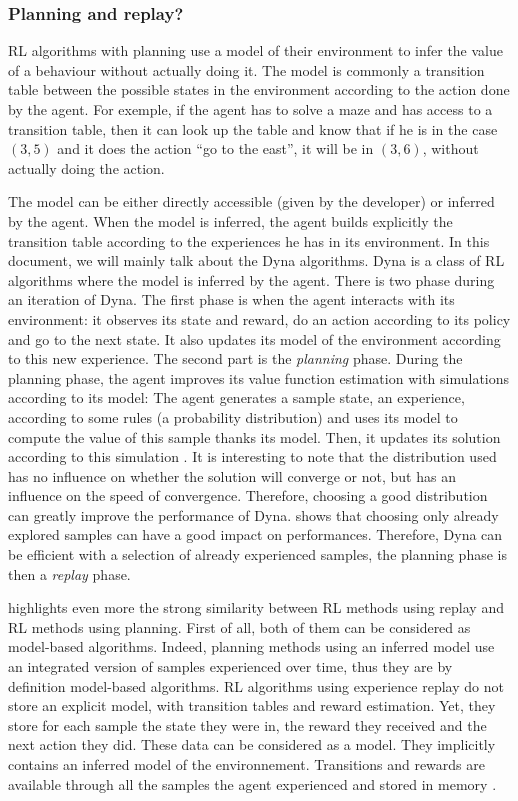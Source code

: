 \documentclass[]{article}
\begin{document}
\subsubsection{Planning and replay?}
\label{subs:Planning and replay}

RL algorithms with planning use a model of their environment to infer the value  of a behaviour without actually doing it. The model is commonly a transition table between the possible states in the environment according to the action done by the agent. For exemple, if the agent has to solve a maze and has access to a transition table, then it can look up the table and know that if he is in the case \((3, 5)\) and it does the action ``go to the east'', it will be in \((3, 6)\), without actually doing the action.

The model can be either directly accessible (given by the developer) or inferred by the agent. When the model is inferred, the agent builds explicitly the transition table according to the experiences he has in its environment. In this document, we will mainly talk about the Dyna algorithms. Dyna is a class of RL algorithms where the model is inferred by the agent. There is two phase during an iteration of Dyna. The first phase is when the agent interacts with its environment: it observes its state and reward, do an action according to its policy and go to the next state. It also updates its model of the environment according to this new experience. The second part is the \emph{planning} phase. During the planning phase, the agent improves its value function estimation with simulations according to its model: The agent generates a sample state, an experience, according to some rules (a probability distribution) and uses its model to compute the value of this sample thanks its model. Then, it updates its solution according to this simulation \parencite{sutton_dyna-style_2012}.
It is interesting to note that the distribution used has no influence on whether the solution will converge or not, but has an influence on the speed of convergence. Therefore, choosing a good distribution can greatly improve the performance of Dyna. \textcite{sutton_dyna-style_2012} shows that choosing only already explored samples can have a good impact on performances. Therefore, Dyna can be efficient with a selection of already experienced samples, the planning phase is then a \emph{replay} phase.

\textcite{vanseijen_deeper_2015} highlights even more the strong similarity between RL methods using replay and RL methods using planning. First of all, both of them can be considered as model-based algorithms. Indeed, planning methods using an inferred model use an integrated version of samples experienced over time, thus they are by definition model-based algorithms.
RL algorithms using experience replay do not store an explicit model, with transition tables and reward estimation. Yet, they store for each sample the state they were in, the reward they received and the next action they did. These data can be considered as a model. They implicitly contains an inferred model of the environnement. Transitions and rewards are available through all the samples the agent experienced and stored in memory \parencite{vanseijen_deeper_2015}.
\end{document}

